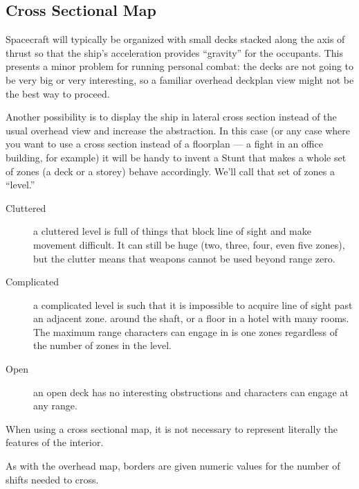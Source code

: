 \subsection{Cross Sectional Map}
\label{sec:personal-combat-cross-sectional-map}

Spacecraft will typically be organized with small decks stacked along the axis of thrust so that the ship's acceleration provides ``gravity'' for the occupants. This presents a minor problem for running personal combat: the decks are not going to be very big or very interesting, so a familiar overhead deckplan view might not be the best way to proceed.

Another possibility is to display the ship in lateral cross section instead of the usual overhead view and increase the abstraction. In this case (or any case where you want to use a cross section instead of a floorplan --- a fight in an office building, for example) it will be handy to invent a Stunt that makes a whole set of zones (a deck or a storey) behave accordingly. We'll call that set of zones a ``level.''

\begin{description}
\item[Cluttered]
a cluttered level is full of things that block line of sight and make movement difficult. It can still be huge (two, three, four, even five zones), but the clutter means that weapons cannot be used beyond range zero.
\item[Complicated]
a complicated level is such that it is impossible to acquire line of sight past an adjacent zone. around the shaft, or a floor in a hotel with many rooms. The maximum range characters can engage in is one zones regardless of the number of zones in the level.
\item[Open]
an open deck has no interesting obstructions and characters can engage at any range.
\end{description}

When using a cross sectional map, it is not necessary to represent literally the features of the interior.

As with the overhead map, borders are given numeric values for the number of shifts needed to cross.

